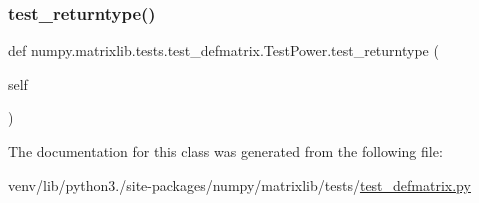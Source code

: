\mbox{\label{classnumpy_1_1matrixlib_1_1tests_1_1test__defmatrix_1_1TestPower_a60260d81ace97f40a58b9e6e1d74e04d}} 
\subsubsection{\texorpdfstring{test\+\_\+returntype()}{test\_returntype()}}
{\footnotesize\ttfamily def numpy.\+matrixlib.\+tests.\+test\+\_\+defmatrix.\+Test\+Power.\+test\+\_\+returntype (\begin{DoxyParamCaption}\item[{}]{self }\end{DoxyParamCaption})}



The documentation for this class was generated from the following file\+:\begin{DoxyCompactItemize}
\item 
venv/lib/python3./site-\/packages/numpy/matrixlib/tests/\hyperlink{test__defmatrix_8py}{test\+\_\+defmatrix.\+py}\end{DoxyCompactItemize}
